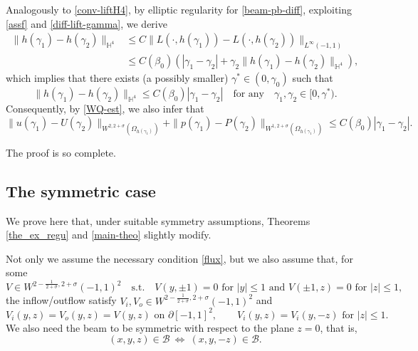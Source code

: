 \documentclass[11pt,a4paper]{amsart}
\theoremstyle{remark}
\theoremstyle{definition}
\numberwithin{equation}{section}
\numberwithin{proposition}{section}
\begin{document}
Analogously to \eqref{conv-liftH4}, by elliptic regularity for \eqref{beam-pb-diff}, exploiting \eqref{assf} and \eqref{diff-lift-gamma}, we derive
\begin{equation*}\begin{aligned}
    \|h(\gamma_1)-h(\gamma_2)\|_{\mathbb{H}^4} &\leq C\| L(\cdot, h(\gamma_1))- L(\cdot, h(\gamma_2))\|_{L^\infty(-1,1)}\\[5pt]&\leq C(\beta_0)\left( |\gamma_1-\gamma_2|+ \gamma_2 \|h(\gamma_1)- h(\gamma_2)\|_{\mathbb{H}^4}    \right),
    \end{aligned}
\end{equation*}which implies that there exists (a possibly smaller) $\gamma^*\in (0, \gamma_0)$ such that
\begin{equation*}
\|h(\gamma_1)-h(\gamma_2)\|_{\mathbb{H}^4}\leq C(\beta_0) |\gamma_1 - \gamma_2| \quad \text{for any} \quad \gamma_1, \gamma_2\in [0, \gamma^*).
\end{equation*} Consequently, by \eqref{WQ-est}, we also infer that
\begin{equation*}
\|u(\gamma_1)-U(\gamma_2)\|_{W^{2, 2+\sigma}(\Omega_{h(\gamma_1)})} +\|p(\gamma_1)-P(\gamma_2)\|_{W^{1, 2+\sigma}(\Omega_{h(\gamma_1)})} \leq C(\beta_0) |\gamma_1 - \gamma_2|.
\end{equation*}

The proof is so complete.






\subsection{The symmetric case}\label{symmetry}

We prove here that, under suitable symmetry assumptions, Theorems \ref{the_ex_regu} and \ref{main-theo} slightly modify.\par
Not only we assume the necessary condition \eqref{flux}, but we also assume that, for some
$$V\in W^{2-\tfrac{1}{2+\sigma}, 2+\sigma }(-1,1)^2\quad\mbox{s.t.}\quad
V(y,\pm1)=0\mbox{ for  }|y|\le1\mbox{ and }V(\pm1 ,z)=0\mbox{ for  }|z|\le1,$$
the inflow/outflow satisfy $V_i, V_o \in W^{2-\tfrac{1}{2+\sigma}, 2+\sigma }(-1,1)^2$ and
\begin{equation}\label{symminout}
V_i(y,z)=V_o(y,z)=V(y,z)\mbox{ on }\partial[-1,1]^2,\qquad V_i(y,z)=V_i(y,-z)\mbox{ for }|z|\le1.
\end{equation}
We also need the beam to be symmetric with respect to the plane $z=0$, that is,
\begin{equation}\label{symbeam}
(x,y,z)\in\mathcal{B}\ \Longleftrightarrow\ (x,y,-z)\in\mathcal{B}.
\end{equation}
\end{document}
